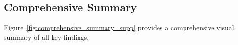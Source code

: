 \documentclass[11pt,twocolumn]{article}
\begin{document}

\subsection{Comprehensive Summary}
\label{app:comprehensive_summary}
Figure~\ref{fig:comprehensive_summary_supp} provides a comprehensive visual summary of all key findings.




\end{document}
